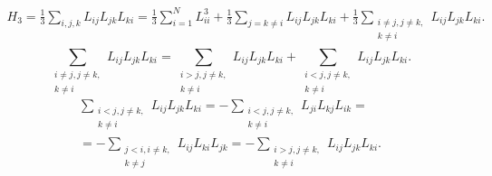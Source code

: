 \documentclass[a4paper]{article}
\begin{document}
\begin{sol}
\begin{multline*}
H_3= \frac{1}{3} \sum_{i,j,k}^{} L_{ij}L_{jk}L_{ki}=
\frac{1}{3}\sum_{i=1}^{N} L_{ii}^3+
\frac{1}{3}\sum_{j=k\neq i}^{} L_{ij}L_{jk}L_{ki}+
\frac{1}{3} \sum_{\substack{i\neq j, j\neq k,\\ k\neq i}}^{} L_{ij}L_{jk}L_{ki}
.\end{multline*} 
\[
\sum_{\substack{i\neq j, j\neq k,\\ k\neq i}}^{} L_{ij}L_{jk}L_{ki}=
\sum_{\substack{i>j, j\neq k,\\ k\neq i}}^{} L_{ij}L_{jk}L_{ki}+
\sum_{\substack{i<j, j\neq k,\\ k\neq i}}^{} L_{ij}L_{jk}L_{ki}
.\] 
\begin{multline*}
\sum_{\substack{i<j, j\neq k,\\ k\neq i}}^{} L_{ij}L_{jk}L_{ki}=-
\sum_{\substack{i<j, j\neq k,\\ k\neq i}}^{} L_{ji}L_{kj}L_{ik}=\\=-
\sum_{\substack{j<i, i\neq k,\\ k\neq j}}^{} L_{ij}L_{ki}L_{jk}=
-\sum_{\substack{i>j, j\neq k,\\ k\neq i}}^{} L_{ij}L_{jk}L_{ki}
.\end{multline*} 

\end{sol}
\end{document}
